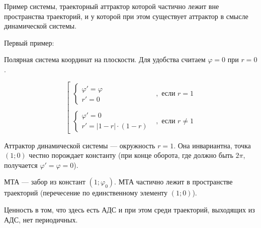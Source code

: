 
\LARGE



Пример системы, траекторный аттрактор которой частично лежит вне пространства траекторий,
и у которой при этом существует аттрактор в смысле динамической системы.

Первый пример:

Полярная система координат на плоскости.
Для удобства считаем $\varphi = 0$ при $r=0$.

\begin{equation}
	\left\lbrack
		\begin{array}{ll}
			\left\{
				\begin{array}{l}
					\varphi ' = \varphi
				\\
					r' = 0
				\end{array}
			\right.
			& , \mbox{~если~} r = 1
			\\\\
			\left\{
				\begin{array}{l}
					\varphi ' = 0
				\\
					r' = |1-r| \cdot (1-r)
				\end{array}
			\right.
			& , \mbox{~если~} r \neq 1
		\end{array}
	\right.
\end{equation}

Аттрактор динамической системы --- окружность $r = 1$.
Она инвариантна, точка $(1; 0)$ честно порождает константу
(при конце оборота, где должно быть $2\pi$, получается $\varphi' = \varphi = 0$).

МТА --- забор из констант $(1;\varphi_0)$.
МТА частично лежит в пространстве траекторий
(перечесение по единственному элементу $(1; 0)$).

Ценность в том, что здесь есть АДС и при этом среди траекторий, выходящих из АДС, нет периодичных.


